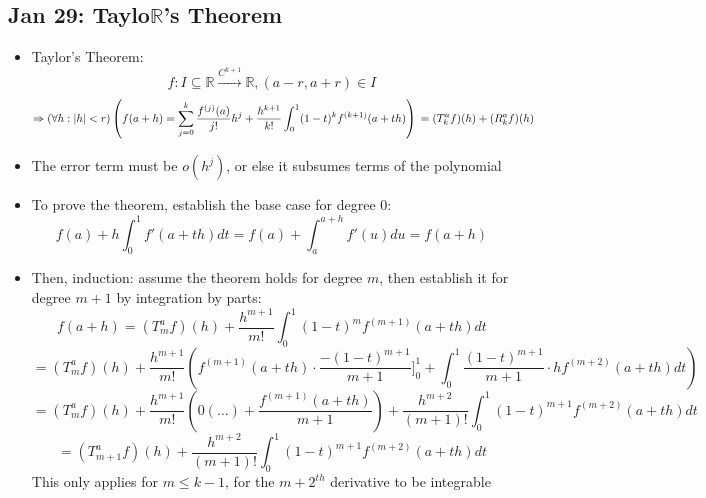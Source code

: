 \documentclass[10pt, oneside]{article}
\let\leq\leqslant
\newcommand{\R}{\mathbb{R}}
\begin{document}
\subsection{Jan 29: Taylo$\R$'s Theorem}
\begin{itemize}
    \item Taylor's Theorem:
        \[f : I \subseteq \R \overset{C^{k+1}}{\longrightarrow} \R, (a-r,a+r) \in I\]
        \[\Rightarrow (\forall h : |h| < r)\left(f(a+h) = \sum_{j=0}^k \frac{f^{(j)}(a)}{j!} h^j + \frac{h^{k+1}}{k!} \int_0^1 (1-t)^k f^{(k+1)}(a + th)\right)\\
        = (T_k^af)(h) + (R_k^af)(h)\]
    \item The error term must be $o(h^j)$, or else it subsumes terms of the polynomial
    \item To prove the theorem, establish the base case for degree $0$:
        \[f(a) + h\int_0^1 f'(a+th) dt = f(a) + \int_a^{a+h} f'(u) du = f(a+h)\]
    \item Then, induction: assume the theorem holds for degree $m$, then establish it for degree $m+1$ by integration by parts:
        \[f(a+h) = (T_m^af)(h) + \frac{h^{m+1}}{m!} \int_0^1 (1-t)^m f^{(m+1)} (a+th) dt\]
        \[= (T_m^af)(h) + \frac{h^{m+1}}{m!} \left( f^{(m+1)} (a+th) \cdot \frac{ - (1-t)^{m+1}}{m+1} \Bigg]_0^1 + \int_0^1 \frac{(1-t)^{m+1}}{m+1} \cdot h f^{(m+2)} (a+th) dt \right)\]
        \[= (T_m^af)(h) + \frac{h^{m+1}}{m!} \left( 0(\hdots) + \frac{f^{(m+1)} (a+th)}{m+1}\right) + \frac{h^{m+2}}{(m+1)!} \int_0^1 (1-t)^{m+1} f^{(m+2)} (a+th) dt\]
        \[= (T_{m+1}^af)(h) + \frac{h^{m+2}}{(m+1)!} \int_0^1 (1-t)^{m+1} f^{(m+2)} (a+th) dt\]
        This only applies for $m\leq k-1$, for the $m+2^{th}$ derivative to be integrable
\end{itemize}
\end{document}
